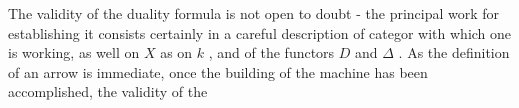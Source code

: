 The validity of the duality formula is not open to doubt - the principal
work for establishing it consists certainly in a careful description of 
 categor  with which one is working, as well on $X$ as on $k$ ,
and of the functors $D$ and $\Delta$ . As the definition of an arrow is immediate,
once the building of the machine has been accomplished, the validity of the

